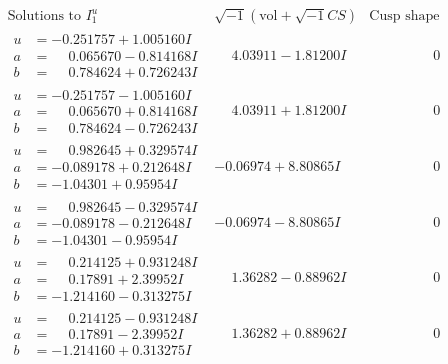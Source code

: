 \documentclass[1p]{elsarticle_modified}
\theoremstyle{definition}
\newcommand{\I}{\sqrt{-1}}
\begin{document}
$$\begin{array}{c|c|c}  
\text{Solutions to }I^u_{1}& \I (\text{vol} + \sqrt{-1}CS) & \text{Cusp shape}\\
 \hline 
\begin{aligned}
u &= -0.251757 + 1.005160 I \\
a &= \phantom{-}0.065670 - 0.814168 I \\
b &= \phantom{-}0.784624 + 0.726243 I\end{aligned}
 & \phantom{-}4.03911 - 1.81200 I & \phantom{-0.000000 } 0 \\ \hline\begin{aligned}
u &= -0.251757 - 1.005160 I \\
a &= \phantom{-}0.065670 + 0.814168 I \\
b &= \phantom{-}0.784624 - 0.726243 I\end{aligned}
 & \phantom{-}4.03911 + 1.81200 I & \phantom{-0.000000 } 0 \\ \hline\begin{aligned}
u &= \phantom{-}0.982645 + 0.329574 I \\
a &= -0.089178 + 0.212648 I \\
b &= -1.04301 + 0.95954 I\end{aligned}
 & -0.06974 + 8.80865 I & \phantom{-0.000000 } 0 \\ \hline\begin{aligned}
u &= \phantom{-}0.982645 - 0.329574 I \\
a &= -0.089178 - 0.212648 I \\
b &= -1.04301 - 0.95954 I\end{aligned}
 & -0.06974 - 8.80865 I & \phantom{-0.000000 } 0 \\ \hline\begin{aligned}
u &= \phantom{-}0.214125 + 0.931248 I \\
a &= \phantom{-}0.17891 + 2.39952 I \\
b &= -1.214160 - 0.313275 I\end{aligned}
 & \phantom{-}1.36282 - 0.88962 I & \phantom{-0.000000 } 0 \\ \hline\begin{aligned}
u &= \phantom{-}0.214125 - 0.931248 I \\
a &= \phantom{-}0.17891 - 2.39952 I \\
b &= -1.214160 + 0.313275 I\end{aligned}
 & \phantom{-}1.36282 + 0.88962 I & \phantom{-0.000000 } 0 \\ \hline\begin{aligned}

\end{aligned}
\end{array}$$
\end{document}
